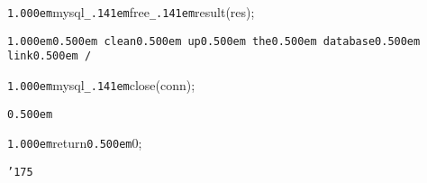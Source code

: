 \noindent
{}{\tt\mc \kern1.000em}mysql{\tt\_\kern.141em}free{\tt\_\kern.141em}result(res);

\noindent
{}{\tt\mc \kern1.000em}\tt\mc {\tt /}{\tt *}\kern0.500em clean\kern0.500em up\kern0.500em the\kern0.500em database\kern0.500em link\kern0.500em {\tt *}{\tt /}
\tt\mc 

\noindent
{}{\tt\mc \kern1.000em}mysql{\tt\_\kern.141em}close(conn);

\noindent
{}{\tt\mc \kern0.500em}

\noindent
{}{\tt\mc \kern1.000em}return{\tt\mc \kern0.500em}0;

\noindent
{}{\tt\char'175}

\noindent
{}

\rm\mc


